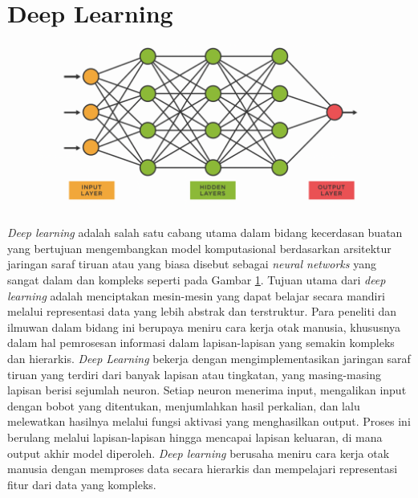 \section{Deep Learning}
\begin{figure}[hbt!]
	\includegraphics[width=0.9\linewidth]{gambar/bener/ArsitekturDeeplearning.png}
	\label{fig:Deep Learning secara umum}
\end{figure}  
\textit{Deep learning} adalah salah satu cabang utama dalam bidang kecerdasan buatan yang bertujuan mengembangkan model komputasional berdasarkan arsitektur jaringan saraf tiruan atau yang biasa disebut sebagai \textit{neural networks} yang sangat dalam dan kompleks seperti pada Gambar \ref{fig:Deep Learning secara umum}. Tujuan utama dari \textit{deep learning} adalah menciptakan mesin-mesin yang dapat belajar secara mandiri melalui representasi data yang lebih abstrak dan terstruktur. Para peneliti dan ilmuwan dalam bidang ini berupaya meniru cara kerja otak manusia, khususnya dalam hal pemrosesan informasi dalam lapisan-lapisan yang semakin kompleks dan hierarkis. \textit{Deep Learning} bekerja dengan mengimplementasikan jaringan saraf tiruan yang terdiri dari banyak lapisan atau tingkatan, yang masing-masing lapisan berisi sejumlah neuron. Setiap neuron menerima input, mengalikan input dengan bobot yang ditentukan, menjumlahkan hasil perkalian, dan lalu melewatkan hasilnya melalui fungsi aktivasi yang menghasilkan output. Proses ini berulang melalui lapisan-lapisan hingga mencapai lapisan keluaran, di mana output akhir model diperoleh. \textit{Deep learning} berusaha meniru cara kerja otak manusia dengan memproses data secara hierarkis dan mempelajari representasi fitur dari data yang kompleks. \cite{patterson2017deep}

